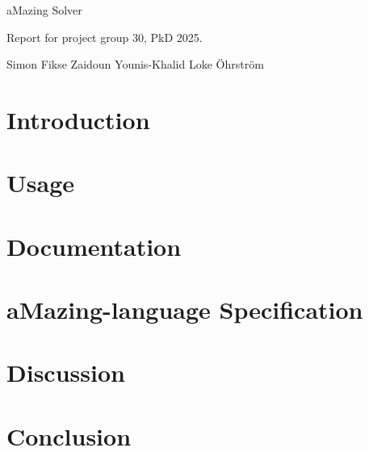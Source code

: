 \documentclass[12pt, a4paper]{article}
\begin{document}
\begin{titlepage}

    \begin{center}

        \begin{LARGE}
            aMazing Solver
        \end{LARGE}

        \vspace{5mm}

        \begin{large}
            Report for project group 30, PkD 2025.
        \end{large}

        \vspace{5mm}

        Simon Fikse \quad Zaidoun Younis-Khalid \quad Loke Öhrström

    \end{center}
\end{titlepage}

\newpage
\tableofcontents
\newpage

\section{Introduction}

\section{Usage}

\section{Documentation}

\section{aMazing-language Specification}

\section{Discussion}

\section{Conclusion}
\end{document}
